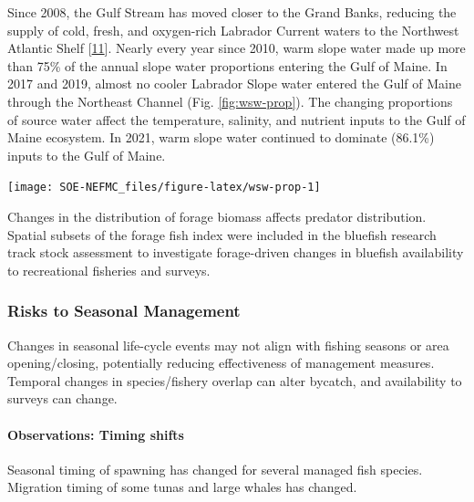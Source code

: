 \documentclass[
  10pt,
]{article}
\let\origfigure\figure
\let\endorigfigure\endfigure
\renewenvironment{figure}[1][2] {
    \expandafter\origfigure\expandafter[H]
} {
    \endorigfigure
}
\begin{document}
Since 2008, the Gulf Stream has moved closer to the Grand Banks, reducing the supply of cold, fresh, and oxygen-rich Labrador Current waters to the Northwest Atlantic Shelf {[}\protect\hyperlink{ref-goncalves_neto_changes_2021}{11}{]}. Nearly every year since 2010, warm slope water made up more than 75\% of the annual slope water proportions entering the Gulf of Maine. In 2017 and 2019, almost no cooler Labrador Slope water entered the Gulf of Maine through the Northeast Channel (Fig. \ref{fig:wsw-prop}). The changing proportions of source water affect the temperature, salinity, and nutrient inputs to the Gulf of Maine ecosystem. In 2021, warm slope water continued to dominate (86.1\%) inputs to the Gulf of Maine.

\begin{figure}

{\centering \texttt{[image: SOE-NEFMC\_files/figure-latex/wsw-prop-1]} 

}

\caption{Proportion of Warm Slope Water (WSW) and Labrador slope water (LSLW) entering the GOM through the Northeast Channel.}\label{fig:wsw-prop}
\end{figure}

Changes in the distribution of forage biomass affects predator distribution. Spatial subsets of the forage fish index were included in the bluefish research track stock assessment to investigate forage-driven changes in bluefish availability to recreational fisheries and surveys.

\hypertarget{risks-to-seasonal-management}{%
\subsubsection{Risks to Seasonal Management}\label{risks-to-seasonal-management}}

Changes in seasonal life-cycle events may not align with fishing seasons or area opening/closing, potentially reducing effectiveness of management measures. Temporal changes in species/fishery overlap can alter bycatch, and availability to surveys can change.

\hypertarget{observations-timing-shifts}{%
\paragraph{Observations: Timing shifts}\label{observations-timing-shifts}}

Seasonal timing of spawning has changed for several managed fish species. Migration timing of some tunas and large whales has changed.
\end{document}
